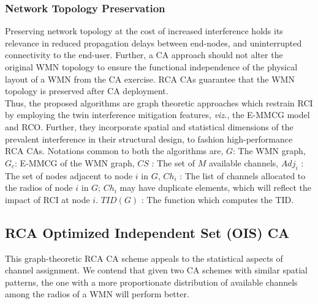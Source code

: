 \documentclass[conference]{IEEEtran}
\begin{document}
 \subsubsection{Network Topology Preservation} 
Preserving network topology at the cost of increased interference holds its relevance in reduced propagation delays between end-nodes, and uninterrupted connectivity to the end-user. Further, a CA approach should not alter the original WMN topology to ensure the functional independence of the physical layout of a WMN from the CA exercise. RCA CAs guarantee that the WMN topology is preserved after CA deployment. \\
Thus, the proposed algorithms are graph theoretic approaches which restrain RCI by employing the twin interference mitigation features, \emph{viz.}, the E-MMCG model and RCO. Further, they incorporate spatial and statistical dimensions of the prevalent interference in their structural design, to fashion high-performance RCA CAs. Notations common to both the algorithms are, $G$: The WMN graph, $G_c$: E-MMCG of the WMN graph, $CS$ : The set of $M$ available channels,  $Adj_i$ : The set of nodes adjacent to node $i$ in $G$, $Ch_i$  : The list of channels allocated to the radios of node $i$ in $G$; $Ch_i$ may have duplicate elements, which will reflect the impact of RCI at node $i$. $TID(G)$ : The function which computes the TID.

\subsection{RCA Optimized Independent Set (OIS) CA}
This graph-theoretic RCA CA scheme appeals to the statistical aspects of channel assignment. We contend that given two CA schemes with similar spatial patterns, the one with a more proportionate distribution of available channels among the radios of a WMN will perform better. 
\end{document}
